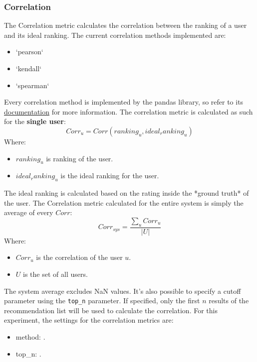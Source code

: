 \documentclass[11pt]{article}
\begin{document}
\subsubsection{Correlation}\label{sec:corr}
The Correlation metric calculates the correlation between the ranking of a user and its ideal ranking.
The current correlation methods implemented are:
\begin{itemize}
    \item `pearson`
    \item `kendall`
    \item `spearman`
\end{itemize}
\hfill\break
\hfill\break
Every correlation method is implemented by the pandas library, so refer to its
\href{https://pandas.pydata.org/docs/reference/api/pandas.Series.corr.html}{documentation} for more information.
\hfill\break
\hfill\break
The correlation metric is calculated as such for the \textbf{single user}:
\hfill\break
\hfill\break
    \[
        Corr_u = Corr(ranking_u, ideal_ranking_u)
    \]
\hfill\break
\hfill\break
    Where:
\begin{itemize}
    \item $ranking_u$ is ranking of the user.
    \item $ideal_ranking_u$ is the ideal ranking for the user.
\end{itemize}
\hfill\break
\hfill\break
The ideal ranking is calculated based on the rating inside the *ground truth* of the user.
The Correlation metric calculated for the entire system is simply the average of every $Corr$:
\hfill\break
\hfill\break
    \[
        Corr_{sys} = \frac{\sum_{u} Corr_u}{|U|}
    \]
\hfill\break
\hfill\break
    Where:
\begin{itemize}
    \item $Corr_u$ is the correlation of the user $u$.
    \item $U$ is the set of all users.
\end{itemize}
\hfill\break
\hfill\break
The system average excludes NaN values.
It's also possible to specify a cutoff parameter using the \texttt{top\_n} parameter. If specified, only the first
$n$ results of the recommendation list will be used to calculate the correlation.
For this experiment, the settings for the correlation metrics are:
\begin{itemize}
    \item method: .
    \item top_n: .
\end{itemize}
\hfill\break
\hfill\break
\end{document}
